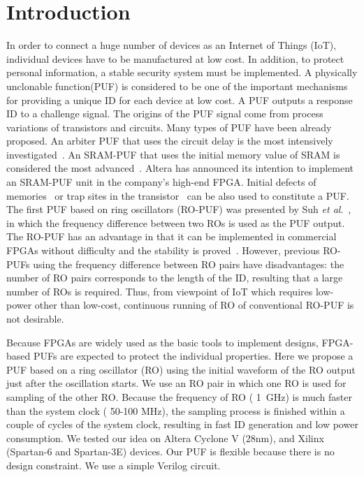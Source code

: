 ﻿\documentclass[aps,preprint,prb,superscriptaddress,amsmath,showpacs,tightenlines]{revtex4}
\begin{document}
\section{Introduction}
In order to connect a huge number 
of devices as an Internet of Things (IoT), individual 
devices have to be manufactured at low cost.
In addition, to protect personal information, 
a stable security system must be implemented.
A physically unclonable function(PUF) is considered to be 
one of the important mechanisms for 
providing a unique ID for each device at low cost.
A PUF outputs a response ID  to a challenge signal.
The origins of the PUF signal  come from  process variations of transistors
and circuits.
Many types of PUF have been already proposed.
An arbiter PUF that uses the circuit delay is the most 
intensively investigated~\cite{arbiter,Lee}.
An SRAM-PUF that uses the initial memory value 
of SRAM is considered the most advanced~\cite{Guajardo,Holcomb}. 
Altera has announced its intention to implement an SRAM-PUF unit 
in the company's high-end FPGA.
Initial defects of memories~\cite{Marukame,RRAM} or 
trap sites in the transistor~\cite{Chen} can be also used to constitute a PUF. 
The first PUF based on ring oscillators (RO-PUF)  
was presented by Suh {\it et al}.~\cite{Suh},
in which the frequency difference between two ROs
is used as the PUF output.
The RO-PUF has an advantage in that it can be implemented 
in commercial FPGAs without difficulty and the stability is 
proved~\cite{Maiti0}.
However, previous RO-PUFs using the frequency difference 
between RO pairs have disadvantages: 
the number of RO pairs corresponds to 
the length of the ID, resulting that a large number of ROs is required. 
Thus, from viewpoint of IoT which requires low-power other than low-cost,
continuous running of RO of conventional RO-PUF is not desirable.


Because  FPGAs are widely used as the basic tools
to implement designs, FPGA-based PUFs are expected to 
protect the individual properties.
Here we propose a PUF based on a ring oscillator (RO) using 
the initial waveform of the RO output just after the oscillation starts.
We use an RO pair in which one RO is used for sampling of the other RO.
Because the frequency of RO ( 1~GHz) is much faster than the system clock
( 50-100 MHz), the sampling process is finished within a couple of 
cycles of the system clock, resulting in fast ID generation and 
low power consumption.
We tested our idea on Altera Cyclone V (28nm), and Xilinx (Spartan-6 and Spartan-3E) devices.
Our PUF is flexible because there is no design constraint. 
We use a simple Verilog circuit.
\end{document}
